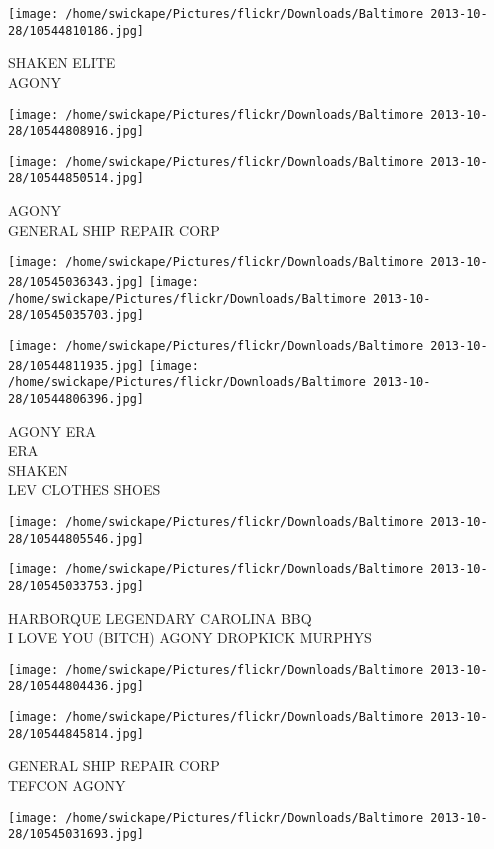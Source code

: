 \documentclass[10pt,letterpaper]{article}
\begin{document}
\vspace{0.25in}
\texttt{[image: /home/swickape/Pictures/flickr/Downloads/Baltimore 2013-10-28/10544810186.jpg]}

SHAKEN ELITE\\
AGONY
\pagebreak

\texttt{[image: /home/swickape/Pictures/flickr/Downloads/Baltimore 2013-10-28/10544808916.jpg]}

\vspace{0.25in}
\texttt{[image: /home/swickape/Pictures/flickr/Downloads/Baltimore 2013-10-28/10544850514.jpg]}

AGONY\\
GENERAL SHIP REPAIR CORP
\pagebreak

\texttt{[image: /home/swickape/Pictures/flickr/Downloads/Baltimore 2013-10-28/10545036343.jpg]}
\texttt{[image: /home/swickape/Pictures/flickr/Downloads/Baltimore 2013-10-28/10545035703.jpg]}

\texttt{[image: /home/swickape/Pictures/flickr/Downloads/Baltimore 2013-10-28/10544811935.jpg]}
\texttt{[image: /home/swickape/Pictures/flickr/Downloads/Baltimore 2013-10-28/10544806396.jpg]}

AGONY ERA\\
ERA\\
SHAKEN\\
LEV CLOTHES SHOES
\pagebreak

\texttt{[image: /home/swickape/Pictures/flickr/Downloads/Baltimore 2013-10-28/10544805546.jpg]}

\vspace{0.25in}
\texttt{[image: /home/swickape/Pictures/flickr/Downloads/Baltimore 2013-10-28/10545033753.jpg]}

HARBORQUE LEGENDARY CAROLINA BBQ\\
I LOVE YOU (BITCH) AGONY DROPKICK MURPHYS
\pagebreak

\texttt{[image: /home/swickape/Pictures/flickr/Downloads/Baltimore 2013-10-28/10544804436.jpg]}

\vspace{0.25in}
\texttt{[image: /home/swickape/Pictures/flickr/Downloads/Baltimore 2013-10-28/10544845814.jpg]}

GENERAL SHIP REPAIR CORP\\
TEFCON AGONY
\pagebreak

\texttt{[image: /home/swickape/Pictures/flickr/Downloads/Baltimore 2013-10-28/10545031693.jpg]}
\end{document}
